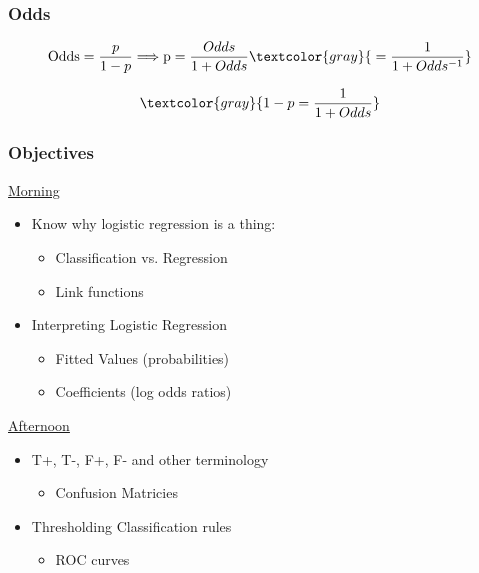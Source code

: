 \documentclass[xcolor={dvipsnames}]{beamer}
\begin{document}
\frame
{
 \frametitle{Odds}
$$\text{Odds} = \frac{p}{1-p} \Longrightarrow \text{p} = \frac{Odds}{1+Odds} \textcolor{gray}{\;= \frac{1}{1+Odds^{-1}}} $$

$$\textcolor{gray}{1-p = \frac{1}{1+Odds}}$$
}



\frame
{
\frametitle{Objectives}

\Large
\underline{Morning}
\begin{itemize}%
\item Know why logistic regression is a thing:
\begin{itemize}
\Large
\item Classification vs. Regression
\item Link functions 
\end{itemize}
\item Interpreting Logistic Regression 
\begin{itemize}
\Large
\item Fitted Values (probabilities)
\item Coefficients (log odds ratios)
\end{itemize}
\end{itemize}
\underline{Afternoon}
\begin{itemize}
\item T+, T-, F+, F- and other terminology
\begin{itemize}
\Large
\item Confusion Matricies
\end{itemize}
\item Thresholding Classification rules
\begin{itemize}
\Large
\item ROC curves
\end{itemize}
\end{itemize}

}
\end{document}
